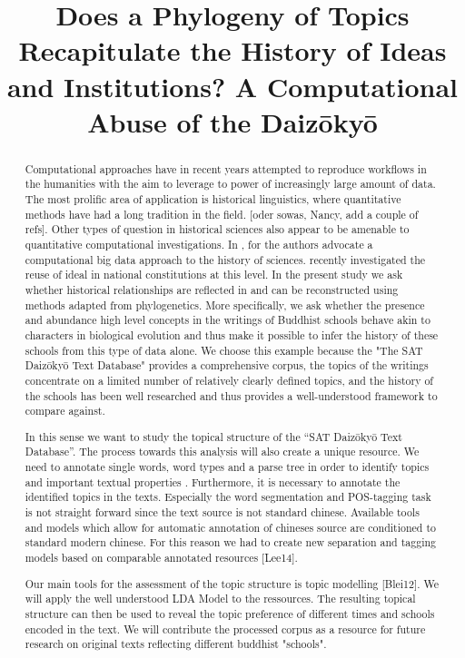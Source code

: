 \documentclass[a4paper,10pt]{article}
\title{Does a Phylogeny of Topics Recapitulate the History of Ideas and Institutions? 
A Computational Abuse of the Daizōkyō }
\author{}
\begin{document}
\maketitle

\begin{abstract}

Computational approaches have in recent years attempted to reproduce workflows 
in the humanities with the aim to leverage to power of increasingly large amount 
of data. The most prolific area of application is historical linguistics, where 
quantitative methods have had a long tradition in the field. [oder sowas, Nancy, 
add a couple of refs]. Other types of question in historical sciences also 
appear to be amenable to quantitative computational investigations. In \cite{Laubichler:13}, 
for the authors advocate a computational big data approach to the history of 
sciences. \cite{Rockmore:16} recently investigated the reuse of ideal in national 
constitutions at this level. In the present study we ask whether historical 
relationships are reflected in and can be reconstructed using methods adapted 
from phylogenetics. More specifically, we ask whether the presence and abundance 
high level concepts in the writings of Buddhist schools behave akin to characters 
in biological evolution and thus make it possible to infer the history of these
schools from this type of data alone. We choose this example because the  "The SAT
Daizōkyō Text Database"  provides a comprehensive corpus, the topics of the 
writings concentrate on a limited number of relatively clearly defined topics, 
and the history of the  schools has been well researched and thus provides a 
well-understood framework to compare against. 


In this sense we want to study the topical structure of the “SAT Daizōkyō Text 
Database”. The process towards this analysis will also create a unique resource. 
We need to annotate single words, word types and a parse tree in order to identify 
topics and important textual properties . Furthermore, it is necessary to annotate 
the identified topics in the texts. Especially the word segmentation and POS-tagging 
task is not straight forward since the text source is not standard chinese. 
Available tools and models which allow for automatic annotation of chineses source 
are conditioned to standard modern chinese. For this reason we had to create new 
separation and tagging models based on comparable annotated resources [Lee14].


Our main tools for the assessment of the topic structure is topic modelling [Blei12]. 
We will apply the well understood LDA Model to the ressources. The resulting topical 
structure can then be used to reveal the topic preference of different times and
schools encoded in the text. We will contribute the processed corpus as a resource 
for future research on original texts reflecting different buddhist "schools".


\end{abstract}
\end{document}
